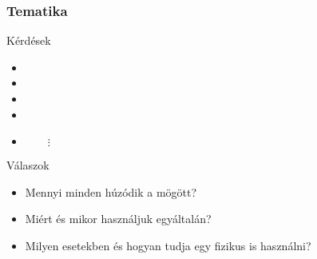 \begin{frame}
\frametitle{Tematika}

\begin{block}{Kérdések}
	\begin{itemize}
		\item {}
		\item {}
		\item {}
		\item {}
		\item[] $\qquad \vdots$
	\end{itemize}
\end{block}

\begin{alertblock}{Válaszok}
	\begin{itemize}
		\item Mennyi minden húzódik a  mögött?
		\item Miért és mikor használjuk egyáltalán?
		\item Milyen esetekben és hogyan tudja egy fizikus is használni?
	\end{itemize}
\end{alertblock}

\end{frame}